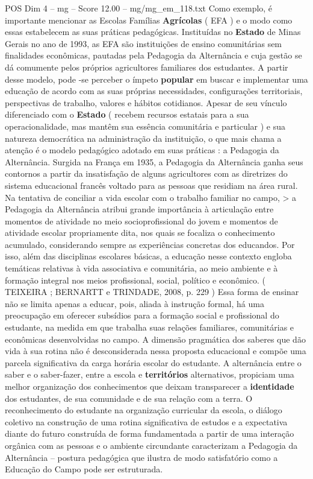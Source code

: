 \begin{textsample}{POS Dim 4 – mg – Score 12.00 – mg/mg\_em\_118.txt}
Como exemplo, é importante mencionar as Escolas Famílias \textbf{Agrícolas} ( EFA ) e o modo como essas estabelecem as suas práticas pedagógicas.
Instituídas no \textbf{Estado} de Minas Gerais no ano de 1993, as EFA são instituições de ensino comunitárias sem finalidades econômicas, pautadas pela Pedagogia da Alternância e cuja gestão se dá comumente pelos próprios agricultores familiares dos estudantes.
A partir desse modelo, pode -se perceber o ímpeto \textbf{popular} em buscar e implementar uma educação de acordo com as suas próprias necessidades, configurações territoriais, perspectivas de trabalho, valores e hábitos cotidianos.
Apesar de seu vínculo diferenciado com o \textbf{Estado} ( recebem recursos estatais para a sua operacionalidade, mas mantêm sua essência comunitária e particular ) e sua natureza democrática na administração da instituição, o que mais chama a atenção é o modelo pedagógico adotado em suas práticas : a Pedagogia da Alternância.
Surgida na França em 1935, a Pedagogia da Alternância ganha seus contornos a partir da insatisfação de alguns agricultores com as diretrizes do sistema educacional francês voltado para as pessoas que residiam na área rural.
Na tentativa de conciliar a vida escolar com o trabalho familiar no campo, > a Pedagogia da Alternância atribui grande importância à articulação entre momentos de atividade no meio socioprofissional do jovem e momentos de atividade escolar propriamente dita, nos quais se focaliza o conhecimento acumulado, considerando sempre as experiências concretas dos educandos.
Por isso, além das disciplinas escolares básicas, a educação nesse contexto engloba temáticas relativas à vida associativa e comunitária, ao meio ambiente e à formação integral nos meios profissional, social, político e econômico. ( TEIXEIRA ; BERNARTT e TRINDADE, 2008, p. 229 ) Essa forma de ensinar não se limita apenas a educar, pois, aliada à instrução formal, há uma preocupação em oferecer subsídios para a formação social e profissional do estudante, na medida em que trabalha suas relações familiares, comunitárias e econômicas desenvolvidas no campo.
A dimensão pragmática dos saberes que dão vida à sua rotina não é desconsiderada nessa proposta educacional e compõe uma parcela significativa da carga horária escolar do estudante.
A alternância entre o saber e o saber-fazer, entre a escola e \textbf{territórios} alternativos, propiciam uma melhor organização dos conhecimentos que deixam transparecer a \textbf{identidade} dos estudantes, de sua comunidade e de sua relação com a terra.
O reconhecimento do estudante na organização curricular da escola, o diálogo coletivo na construção de uma rotina significativa de estudos e a expectativa diante do futuro construída de forma fundamentada a partir de uma interação orgânica com as pessoas e o ambiente circundante caracterizam a Pedagogia da Alternância – postura pedagógica que ilustra de modo satisfatório como a Educação do Campo pode ser estruturada.

\end{textsample}
